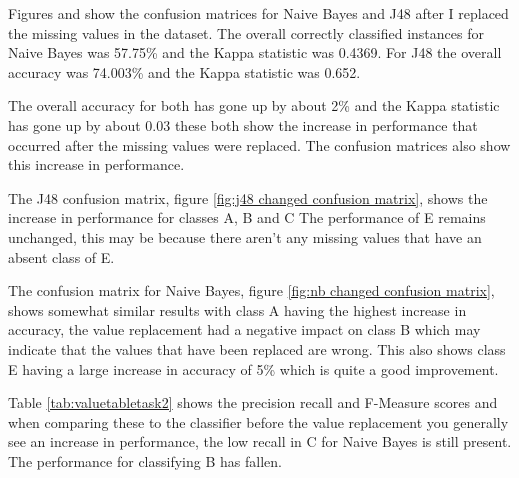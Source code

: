 \documentclass[10pt]{article}
\begin{document}
Figures  and  show the confusion matrices for Naive Bayes and J48 after I replaced the missing values in the dataset. The overall correctly classified instances for Naive Bayes was 57.75\% and the Kappa statistic was 0.4369. For J48 the overall accuracy was 74.003\% and the Kappa statistic was 0.652. 

The overall accuracy for both has gone up by about 2\% and the Kappa statistic has gone up by about 0.03 these both show the increase in performance that occurred after the missing values were replaced. The confusion matrices also show this increase in performance.

The J48 confusion matrix, figure \ref{fig:j48 changed confusion matrix}, shows the increase in performance for classes A, B and C The performance of E remains unchanged, this may be because there aren't any missing values that have an absent class of E.

The confusion matrix for Naive Bayes, figure \ref{fig:nb changed confusion matrix}, shows somewhat similar results with class A having the highest increase in accuracy, the value replacement had a negative impact on class B which may indicate that the values that have been replaced are wrong. This also shows class E having a large increase in accuracy of 5\% which is quite a good improvement. 

Table \ref{tab:valuetabletask2} shows the precision recall and F-Measure scores and when comparing these to the classifier before the value replacement you generally see an increase in performance, the low recall in C for Naive Bayes is still present. The performance for classifying B has fallen.
\end{document}
